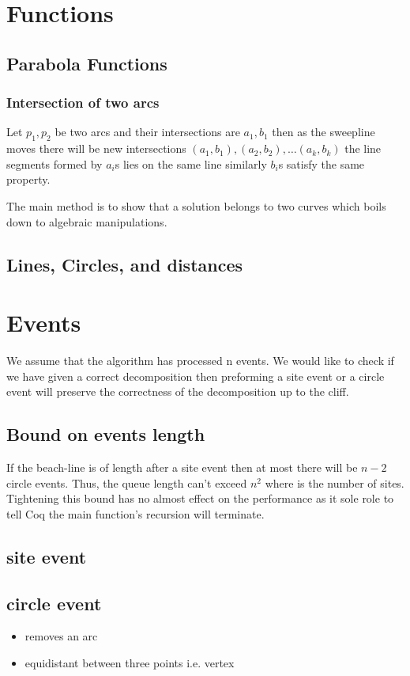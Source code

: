 \documentclass{article}
\begin{document}
\section{Functions}
\subsection{Parabola Functions}
\subsubsection{Intersection of two arcs}
Let $p_1, p_2$ be two arcs and their intersections are $a_1, b_1$ then as the sweepline moves there will be new intersections $\left(a_1, b_1\right),\left(a_2, b_2\right),\dots \left(a_k, b_k\right)$ the line segments formed by $a_i$s lies on the same line similarly  $b_i$s satisfy the same property.

The main method is to show that a solution belongs to two curves which boils down to algebraic manipulations.

\subsection{Lines, Circles, and distances}
\section{Events}
We assume that the algorithm has processed n events. We would like to check if we have given a correct decomposition then preforming a site event or a circle event will preserve the correctness of the decomposition up to the cliff.

\subsection{Bound on events length} If the beach-line is of length after a site event then at most there will be $n-2$ circle events. Thus, the queue length can't exceed $n^2$ where is the number of sites. Tightening this bound has no almost effect on the performance as it sole role to tell Coq the main function's recursion will terminate.


\subsection{site event}


\subsection{circle event}
\begin{itemize}
    \item removes an arc
    \item equidistant between three points i.e. vertex
    
\end{itemize}
\end{document}
